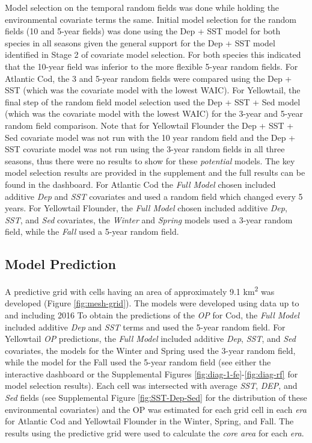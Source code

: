 \documentclass[
]{article}
\begin{document}
Model selection on the temporal random fields was done while holding the environmental covariate terms the same. Initial model selection for the random fields (10 and 5-year fields) was done using the Dep + SST model for both species in all seasons given the general support for the Dep + SST model identified in Stage 2 of covariate model selection. For both species this indicated that the 10-year field was inferior to the more flexible 5-year random fields. For Atlantic Cod, the 3 and 5-year random fields were compared using the Dep + SST (which was the covariate model with the lowest WAIC). For Yellowtail, the final step of the random field model selection used the Dep + SST + Sed model (which was the covariate model with the lowest WAIC) for the 3-year and 5-year random field comparison. Note that for Yellowtail Flounder the Dep + SST + Sed covariate model was not run with the 10 year random field and the Dep + SST covariate model was not run using the 3-year random fields in all three seasons, thus there were no results to show for these \emph{potential} models. The key model selection results are provided in the supplement and the full results can be found in the dashboard. For Atlantic Cod the \emph{Full Model} chosen included additive \emph{Dep} and \emph{SST} covariates and used a random field which changed every 5 years. For Yellowtail Flounder, the \emph{Full Model} chosen included additive \emph{Dep}, \emph{SST}, and \emph{Sed} covariates, the \emph{Winter} and \emph{Spring} models used a 3-year random field, while the \emph{Fall} used a 5-year random field.

\hypertarget{model-prediction}{%
\subsection{Model Prediction}\label{model-prediction}}

A predictive grid with cells having an area of approximately 9.1 km\textsuperscript{2} was developed (Figure \ref{fig:mesh-grid}). The models were developed using data up to and including 2016 To obtain the predictions of the \emph{OP} for Cod, the \emph{Full Model} included additive \emph{Dep} and \emph{SST} terms and used the 5-year random field. For Yellowtail \emph{OP} predictions, the \emph{Full Model} included additive \emph{Dep}, \emph{SST}, and \emph{Sed} covariates, the models for the Winter and Spring used the 3-year random field, while the model for the Fall used the 5-year random field (see either the interactive dashboard or the Supplemental Figures \ref{fig:diag-1-fe}-\ref{fig:diag-rf} for model selection results). Each cell was intersected with average \emph{SST}, \emph{DEP}, and \emph{Sed} fields (see Supplemental Figure \ref{fig:SST-Dep-Sed} for the distribution of these environmental covariates) and the OP was estimated for each grid cell in each \emph{era} for Atlantic Cod and Yellowtail Flounder in the Winter, Spring, and Fall. The results using the predictive grid were used to calculate the \emph{core area} for each \emph{era}.
\end{document}
